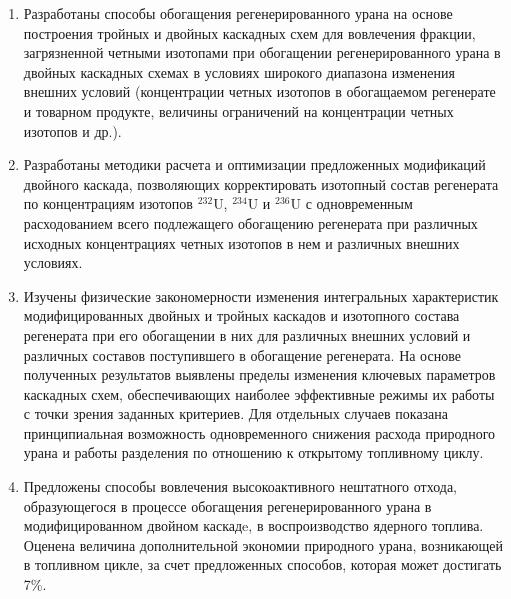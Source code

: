 \begin{enumerate}[leftmargin=0.5cm]
\end{enumerate}

{\novelty}
\begin{enumerate}[leftmargin=0.5cm]
  \item Разработаны способы обогащения регенерированного урана на основе построения тройных и двойных каскадных схем для вовлечения фракции, загрязненной четными изотопами при обогащении регенерированного урана в двойных каскадных схемах в условиях широкого диапазона изменения внешних условий (концентрации четных изотопов в обогащаемом регенерате и товарном продукте, величины ограничений на концентрации четных изотопов и др.).
  \item Разработаны методики расчета и оптимизации предложенных модификаций двойного каскада, позволяющих корректировать изотопный состав регенерата по концентрациям изотопов $^{232}$U, $^{234}$U и $^{236}$U с одновременным расходованием всего подлежащего обогащению регенерата при различных исходных концентрациях четных изотопов в нем и различных внешних условиях.
  \item Изучены физические закономерности изменения интегральных характеристик модифицированных двойных и тройных каскадов и изотопного состава регенерата при его обогащении в них для различных внешних условий и различных составов поступившего в обогащение регенерата. На основе полученных результатов выявлены пределы изменения ключевых параметров каскадных схем, обеспечивающих наиболее эффективные режимы их работы с точки зрения заданных критериев.  Для отдельных случаев показана принципиальная возможность одновременного снижения расхода природного урана и работы разделения по отношению к открытому топливному циклу.
  \item Предложены способы вовлечения высокоактивного нештатного отхода, образующегося в процессе обогащения регенерированного урана в модифицированном двойном каскадe, в воспроизводство ядерного топлива. Оценена величина дополнительной экономии природного урана, возникающей в топливном цикле, за счет предложенных способов, которая может достигать 7\%.
\end{enumerate}


